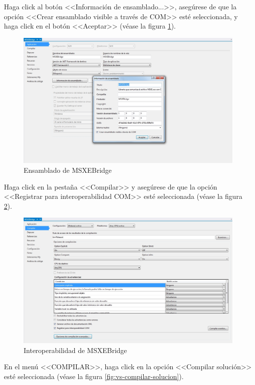 \newpage

Haga click al bot\'{o}n <<Informaci\'{o}n de ensamblado...>>, aseg\'{u}rese de que la opci\'{o}n <<Crear ensamblado visible a trav\'{e}s de COM>> est\'{e} seleccionada, y haga click en el bot\'{o}n <<Aceptar>> (v\'{e}ase la figura \ref{fig:vs-ensamblado}).

\begin{figure}[H]
  \centering
  \includegraphics[width=.75\linewidth]{./img/vs-ensamblado.jpg}
\caption[Ensamblado de MSXEBridge]{Ensamblado de MSXEBridge\label{fig:vs-ensamblado}}
\end{figure}

Haga click en la pesta\~{n}a <<Compilar>> y aseg\'{u}rese de que la opci\'{o}n <<Registrar para interoperabilidad COM>> est\'{e} seleccionada (v\'{e}ase la figura \ref{fig:vs-compilar}).

\begin{figure}[H]
  \centering
  \includegraphics[width=.75\linewidth]{./img/vs-compilar.jpg}
\caption[Interoperabilidad de MSXEBridge]{Interoperabilidad de MSXEBridge\label{fig:vs-compilar}}
\end{figure}

\newpage

En el men\'{u} <<COMPILAR>>, haga click en la opci\'{o}n <<Compilar soluci\'{o}n>> est\'{e} seleccionada (v\'{e}ase la figura \ref{fig:vs-compilar-solucion}).

